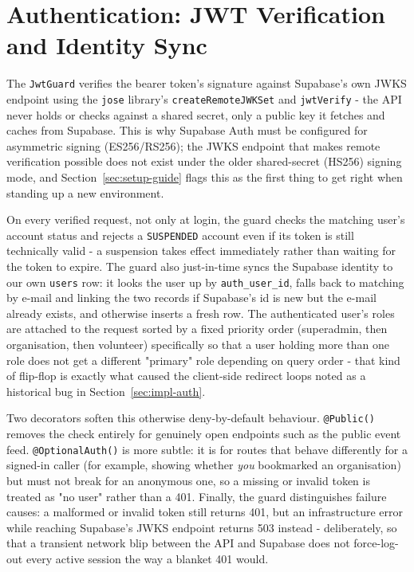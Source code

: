 \section{Authentication: JWT Verification and Identity Sync}
\label{sec:jwt-internals}
The \texttt{JwtGuard} verifies the bearer token's signature against Supabase's own JWKS endpoint using the \texttt{jose} library's \texttt{createRemoteJWKSet} and \texttt{jwtVerify} - the API never holds or checks against a shared secret, only a public key it fetches and caches from Supabase. This is why Supabase Auth must be configured for asymmetric signing (ES256/RS256); the JWKS endpoint that makes remote verification possible does not exist under the older shared-secret (HS256) signing mode, and Section~\ref{sec:setup-guide} flags this as the first thing to get right when standing up a new environment.

On every verified request, not only at login, the guard checks the matching user's account status and rejects a \texttt{SUSPENDED} account even if its token is still technically valid - a suspension takes effect immediately rather than waiting for the token to expire. The guard also just-in-time syncs the Supabase identity to our own \texttt{users} row: it looks the user up by \texttt{auth\_user\_id}, falls back to matching by e-mail and linking the two records if Supabase's id is new but the e-mail already exists, and otherwise inserts a fresh row. The authenticated user's roles are attached to the request sorted by a fixed priority order (superadmin, then organisation, then volunteer) specifically so that a user holding more than one role does not get a different "primary" role depending on query order - that kind of flip-flop is exactly what caused the client-side redirect loops noted as a historical bug in Section~\ref{sec:impl-auth}.

Two decorators soften this otherwise deny-by-default behaviour. \texttt{@Public()} removes the check entirely for genuinely open endpoints such as the public event feed. \texttt{@OptionalAuth()} is more subtle: it is for routes that behave differently for a signed-in caller (for example, showing whether \emph{you} bookmarked an organisation) but must not break for an anonymous one, so a missing or invalid token is treated as "no user" rather than a 401. Finally, the guard distinguishes failure causes: a malformed or invalid token still returns 401, but an infrastructure error while reaching Supabase's JWKS endpoint returns 503 instead - deliberately, so that a transient network blip between the API and Supabase does not force-log-out every active session the way a blanket 401 would.

